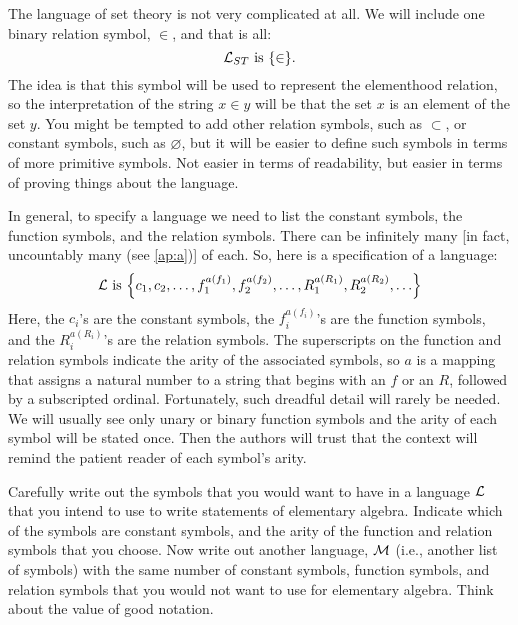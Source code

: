 \begin{eg}\label{1.2.3}
  The language of set theory is not very complicated at all.
  We will include one binary relation symbol, \(\in\), and that is all:
  \[
    \Lc_{ST} \text{ is } \set{\in}.
  \]
  The idea is that this symbol will be used to represent the elementhood relation, so the interpretation of the string \(x \in y\) will be that the set \(x\) is an element of the set \(y\).
  You might be tempted to add other relation symbols, such as \(\subset\), or constant symbols, such as \(\varnothing\), but it will be easier to define such symbols in terms of more primitive symbols.
  Not easier in terms of readability, but easier in terms of proving things about the language.
\end{eg}

\begin{note}
  In general, to specify a language we need to list the constant symbols, the function symbols, and the relation symbols.
  There can be infinitely many [in fact, uncountably many (see \cref{ap:a})] of each.
  So, here is a specification of a language:
  \[
    \Lc \text{ is } \set{c_1, c_2, \dots, f_1^{a(f_1)}, f_2^{a(f_2)}, \dots, R_1^{a(R_1)}, R_2^{a(R_2)}, \dots}
  \]
  Here, the \(c_i\)'s are the constant symbols, the \(f_i^{a(f_i)}\)'s are the function symbols, and the \(R_i^{a(R_i)}\)'s are the relation symbols.
  The superscripts on the function and relation symbols indicate the arity of the associated symbols, so \(a\) is a mapping that assigns a natural number to a string that begins with an \(f\) or an \(R\), followed by a subscripted ordinal.
  Fortunately, such dreadful detail will rarely be needed.
  We will usually see only unary or binary function symbols and the arity of each symbol will be stated once.
  Then the authors will trust that the context will remind the patient reader of each symbol's arity.
\end{note}

\exercisesection

\begin{ex}\label{ex:1.2.1}
  Carefully write out the symbols that you would want to have in a language \(\mathcal{L}\) that you intend to use to write statements of elementary algebra.
  Indicate which of the symbols are constant symbols, and the arity of the function and relation symbols that you choose.
  Now write out another language, \(\mathcal{M}\) (i.e., another list of symbols) with the same number of constant symbols, function symbols, and relation symbols that you would not want to use for elementary algebra.
  Think about the value of good notation.
\end{ex}

